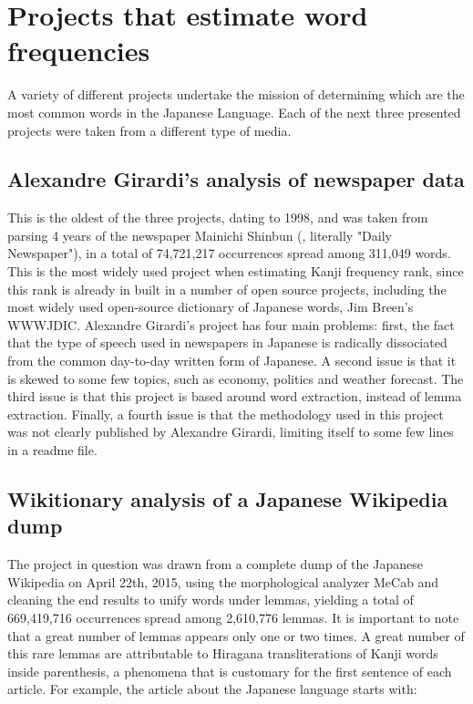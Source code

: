 \section{Projects that estimate word frequencies}
A variety of different projects undertake the mission of determining which are the most common words in the Japanese Language. Each of the next three presented projects were taken from a different type of media.

\subsection{Alexandre Girardi's analysis of newspaper data}
This is the oldest of the three projects, dating to 1998, and was taken from parsing 4 years of the newspaper Mainichi Shinbun (, literally "Daily Newspaper"), in a total of 74,721,217 occurrences spread among 311,049 words\cite{monash}. This is the most widely used project when estimating Kanji frequency rank, since this rank is already in built in a number of open source projects, including the most widely used open-source dictionary of Japanese words, Jim Breen's WWWJDIC\cite{breen2000japanese}. Alexandre Girardi's project has four main problems: first, the fact that the type of speech used in newspapers in Japanese is radically dissociated from the common day-to-day written form of Japanese. A second issue is that it is skewed to some few topics, such as economy, politics and weather forecast. The third issue is that this project is based around word extraction, instead of lemma extraction. Finally, a fourth issue is that the methodology used in this project was not clearly published by Alexandre Girardi, limiting itself to some few lines in a readme file.

\subsection{Wikitionary analysis of a Japanese Wikipedia dump}
The project in question was drawn from a complete dump of the Japanese Wikipedia on April 22th, 2015, using the morphological analyzer MeCab\cite{kudo2005mecab} and cleaning the end results to unify words under lemmas, yielding a total of 669,419,716 occurrences spread among 2,610,776 lemmas\cite{wikitionary2015wordfreq}. It is important to note that a great number of lemmas appears only one or two times. A great number of this rare lemmas are attributable to Hiragana transliterations of Kanji words inside parenthesis, a phenomena that is customary for the first sentence of each article. For example, the article about the Japanese language starts with:

